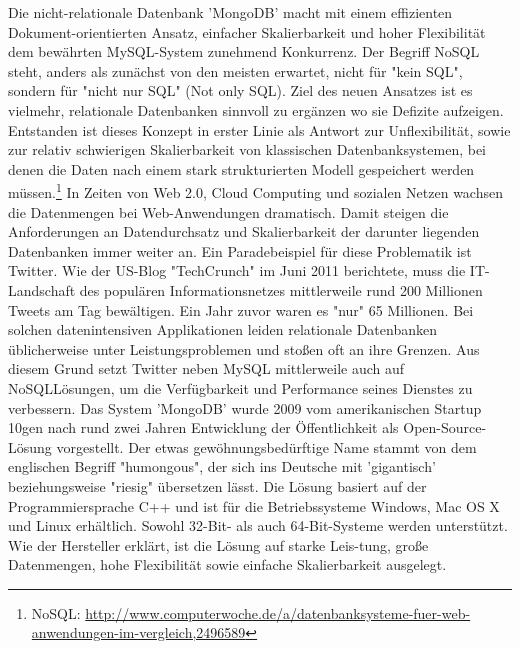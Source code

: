 Die nicht-relationale Datenbank 'MongoDB' macht mit einem effizienten Dokument-orientierten Ansatz, einfacher Skalierbarkeit und hoher Flexibilität dem bewährten MySQL-System zunehmend Konkurrenz. Der Begriff NoSQL steht, anders als zunächst von den meisten erwartet, nicht für "kein SQL", sondern für "nicht nur SQL" (Not only SQL). Ziel des neuen Ansatzes ist es vielmehr, relationale Datenbanken sinnvoll zu ergänzen wo sie Defizite aufzeigen. Entstanden ist dieses Konzept in erster Linie als Antwort zur Unflexibilität, sowie zur relativ schwierigen Skalierbarkeit von klassischen Datenbanksystemen, bei denen die Daten nach einem stark strukturierten Modell gespeichert werden müssen.\footnote{NoSQL: \url{http://www.computerwoche.de/a/datenbanksysteme-fuer-web-anwendungen-im-vergleich,2496589}} \newline\newline
In Zeiten von Web 2.0, Cloud Computing und sozialen Netzen wachsen die Datenmengen bei Web-Anwendungen dramatisch. Damit steigen die Anforderungen an Datendurchsatz und Skalierbarkeit der darunter liegenden Datenbanken immer weiter an. Ein Paradebeispiel für diese Problematik ist Twitter. Wie der US-Blog "TechCrunch" im Juni 2011 berichtete, muss die IT-Landschaft des populären Informationsnetzes mittlerweile rund 200 Millionen Tweets am Tag bewältigen. Ein Jahr zuvor waren es "nur" 65 Millionen. Bei solchen datenintensiven Applikationen leiden relationale Datenbanken üblicherweise unter Leistungsproblemen und stoßen oft an ihre Grenzen. Aus diesem Grund setzt Twitter neben MySQL mittlerweile auch auf NoSQLLösungen, um die Verfügbarkeit und Performance seines Dienstes zu verbessern.\newline\newline
Das System 'MongoDB' wurde 2009 vom amerikanischen Startup 10gen nach rund zwei Jahren Entwicklung der Öffentlichkeit als Open-Source-Lösung vorgestellt. Der etwas gewöhnungsbedürftige Name stammt von dem englischen Begriff "humongous", der sich ins Deutsche mit 'gigantisch'  beziehungsweise "riesig" übersetzen lässt. Die Lösung basiert auf der Programmiersprache C++ und ist für die Betriebssysteme Windows, Mac OS X und Linux erhältlich. Sowohl 32-Bit- als auch 64-Bit-Systeme werden unterstützt.\newline\newline
Wie der Hersteller erklärt, ist die Lösung auf starke Leis-tung, große Datenmengen, hohe Flexibilität sowie einfache Skalierbarkeit ausgelegt.
